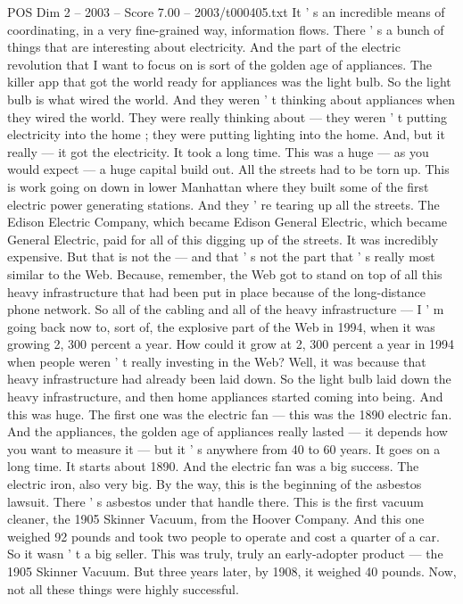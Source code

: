 \begin{textsample}{POS Dim 2 – 2003 – Score 7.00 – 2003/t000405.txt}
It ' s an incredible means of coordinating, in a very fine-grained way, information flows.
There ' s a bunch of things that are interesting about electricity.
And the part of the electric revolution that I want to focus on is sort of the golden age of appliances.
The killer app that got the world ready for appliances was the light bulb.
So the light bulb is what wired the world.
And they weren ' t thinking about appliances when they wired the world.
They were really thinking about — they weren ' t putting electricity into the home ; they were putting lighting into the home.
And, but it really — it got the electricity.
It took a long time.
This was a huge — as you would expect — a huge capital build out.
All the streets had to be torn up.
This is work going on down in lower Manhattan where they built some of the first electric power generating stations.
And they ' re tearing up all the streets.
The Edison Electric Company, which became Edison General Electric, which became General Electric, paid for all of this digging up of the streets.
It was incredibly expensive.
But that is not the — and that ' s not the part that ' s really most similar to the Web.
Because, remember, the Web got to stand on top of all this heavy infrastructure that had been put in place because of the long-distance phone network.
So all of the cabling and all of the heavy infrastructure — I ' m going back now to, sort of, the explosive part of the Web in 1994, when it was growing 2, 300 percent a year.
How could it grow at 2, 300 percent a year in 1994 when people weren ' t really investing in the Web?
Well, it was because that heavy infrastructure had already been laid down.
So the light bulb laid down the heavy infrastructure, and then home appliances started coming into being.
And this was huge.
The first one was the electric fan — this was the 1890 electric fan.
And the appliances, the golden age of appliances really lasted — it depends how you want to measure it — but it ' s anywhere from 40 to 60 years.
It goes on a long time.
It starts about 1890.
And the electric fan was a big success.
The electric iron, also very big.
By the way, this is the beginning of the asbestos lawsuit.
There ' s asbestos under that handle there.
This is the first vacuum cleaner, the 1905 Skinner Vacuum, from the Hoover Company.
And this one weighed 92 pounds and took two people to operate and cost a quarter of a car.
So it wasn ' t a big seller.
This was truly, truly an early-adopter product — the 1905 Skinner Vacuum.
But three years later, by 1908, it weighed 40 pounds.
Now, not all these things were highly successful.

\end{textsample}
